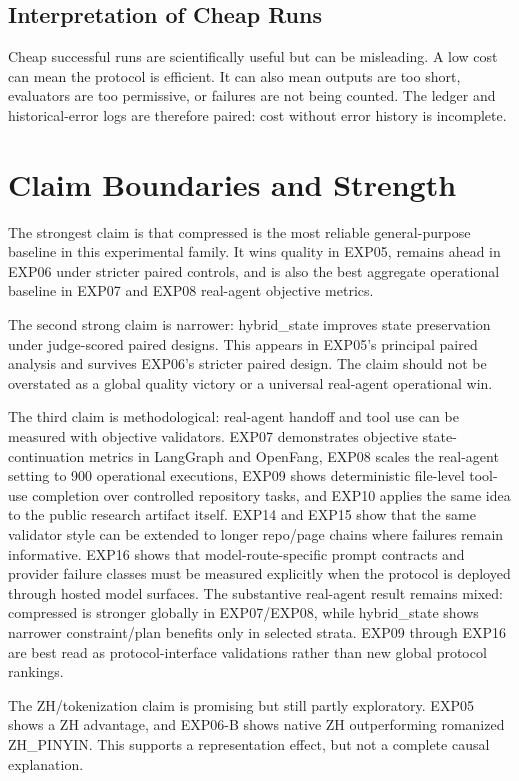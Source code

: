 \documentclass[11pt]{article}
\begin{document}
\subsection{Interpretation of Cheap Runs}
Cheap successful runs are scientifically useful but can be misleading. A low cost can mean the protocol is efficient. It can also mean outputs are too short, evaluators are too permissive, or failures are not being counted. The ledger and historical-error logs are therefore paired: cost without error history is incomplete.

\section{Claim Boundaries and Strength}
The strongest claim is that compressed is the most reliable general-purpose baseline in this experimental family. It wins quality in EXP05, remains ahead in EXP06 under stricter paired controls, and is also the best aggregate operational baseline in EXP07 and EXP08 real-agent objective metrics.

The second strong claim is narrower: hybrid\_state improves state preservation under judge-scored paired designs. This appears in EXP05's principal paired analysis and survives EXP06's stricter paired design. The claim should not be overstated as a global quality victory or a universal real-agent operational win.

The third claim is methodological: real-agent handoff and tool use can be measured with objective validators. EXP07 demonstrates objective state-continuation metrics in LangGraph and OpenFang, EXP08 scales the real-agent setting to 900 operational executions, EXP09 shows deterministic file-level tool-use completion over controlled repository tasks, and EXP10 applies the same idea to the public research artifact itself. EXP14 and EXP15 show that the same validator style can be extended to longer repo/page chains where failures remain informative. EXP16 shows that model-route-specific prompt contracts and provider failure classes must be measured explicitly when the protocol is deployed through hosted model surfaces. The substantive real-agent result remains mixed: compressed is stronger globally in EXP07/EXP08, while hybrid\_state shows narrower constraint/plan benefits only in selected strata. EXP09 through EXP16 are best read as protocol-interface validations rather than new global protocol rankings.

The ZH/tokenization claim is promising but still partly exploratory. EXP05 shows a ZH advantage, and EXP06-B shows native ZH outperforming romanized ZH\_PINYIN. This supports a representation effect, but not a complete causal explanation.
\end{document}
